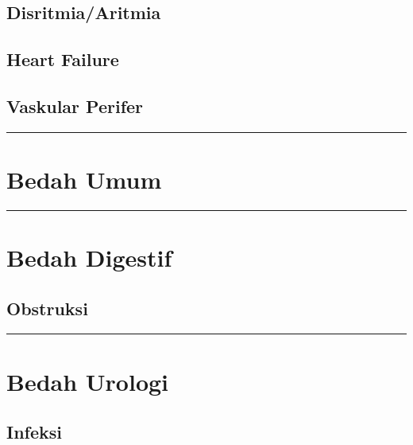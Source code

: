 \documentclass[
]{book}
\begin{document}
\hypertarget{disritmiaaritmia}{%
\subsection{Disritmia/Aritmia}\label{disritmiaaritmia}}

\hypertarget{heart-failure}{%
\subsection{Heart Failure}\label{heart-failure}}

\hypertarget{vaskular-perifer}{%
\subsection{Vaskular Perifer}\label{vaskular-perifer}}

\begin{center}\rule{0.5\linewidth}{0.5pt}\end{center}

\hypertarget{bedah-umum-1}{%
\section{Bedah Umum}\label{bedah-umum-1}}

\begin{center}\rule{0.5\linewidth}{0.5pt}\end{center}

\hypertarget{bedah-digestif-1}{%
\section{Bedah Digestif}\label{bedah-digestif-1}}

\hypertarget{obstruksi-1}{%
\subsection{Obstruksi}\label{obstruksi-1}}

\begin{center}\rule{0.5\linewidth}{0.5pt}\end{center}

\hypertarget{bedah-urologi}{%
\section{Bedah Urologi}\label{bedah-urologi}}

\hypertarget{infeksi-3}{%
\subsection{Infeksi}\label{infeksi-3}}
\end{document}
